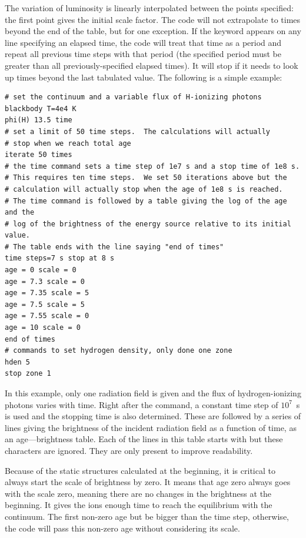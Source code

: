 \begin{shaded}
The variation of luminosity is linearly interpolated between the 
points specified: the first point gives the initial scale factor.
The code will not extrapolate to times
beyond the end of the table, but for one exception.  If the keyword 
appears on any line specifying an elapsed time, the code will treat that time as a
period and repeat all previous time steps with that period (the specified period
must be greater than all previously-specified elapsed times).
It will stop if it needs to look up times
beyond the last tabulated value.
The following is a simple example:
\begin{verbatim}
# set the continuum and a variable flux of H-ionizing photons
blackbody T=4e4 K
phi(H) 13.5 time
# set a limit of 50 time steps.  The calculations will actually
# stop when we reach total age
iterate 50 times
# the time command sets a time step of 1e7 s and a stop time of 1e8 s.
# This requires ten time steps.  We set 50 iterations above but the
# calculation will actually stop when the age of 1e8 s is reached.
# The time command is followed by a table giving the log of the age and the
# log of the brightness of the energy source relative to its initial value.
# The table ends with the line saying "end of times"
time steps=7 s stop at 8 s
age = 0 scale = 0
age = 7.3 scale = 0
age = 7.35 scale = 5
age = 7.5 scale = 5
age = 7.55 scale = 0
age = 10 scale = 0
end of times
# commands to set hydrogen density, only done one zone
hden 5
stop zone 1
\end{verbatim}

In this example, only one radiation field is given and the flux of
hydrogen-ionizing photons varies with time.  Right after the  command, a constant time step of $10^7$~s is used and the stopping time is also determined. These are followed by a series of lines giving the
brightness of the incident radiation field as a function of time, as an age---brightness table. Each of the lines in this table starts
with  but these characters are ignored. They are only present to improve readability.


Because of the static structures calculated at the beginning, it is critical to always start the scale of brightness by 
zero. It means  that age zero always goes with the scale zero, meaning  there are no changes in the brightness at the beginning. It gives the ions enough time to reach the 
equilibrium with the continuum. The first non-zero age but be bigger than the time step, otherwise, the code will pass this non-zero age without considering its scale.  


\end{shaded}
